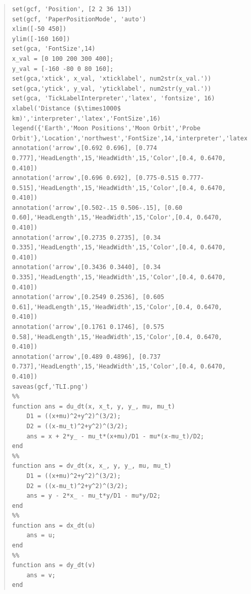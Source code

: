 \documentclass[conf]{new-aiaa}
\begin{document}
\begin{quote}
\begin{lstlisting}
set(gcf, 'Position', [2 2 36 13])
set(gcf, 'PaperPositionMode', 'auto')
xlim([-50 450])
ylim([-160 160])
set(gca, 'FontSize',14)
x_val = [0 100 200 300 400];
y_val = [-160 -80 0 80 160];
set(gca,'xtick', x_val, 'xticklabel', num2str(x_val.'))
set(gca,'ytick', y_val, 'yticklabel', num2str(y_val.'))
set(gca, 'TickLabelInterpreter','latex', 'fontsize', 16)
xlabel('Distance ($\times1000$ km)','interpreter','latex','FontSize',16)
legend({'Earth','Moon Positions','Moon Orbit','Probe Orbit'},'Location','northwest','FontSize',14,'interpreter','latex')
annotation('arrow',[0.692 0.696], [0.774 0.777],'HeadLength',15,'HeadWidth',15,'Color',[0.4, 0.6470, 0.410])
annotation('arrow',[0.696 0.692], [0.775-0.515 0.777-0.515],'HeadLength',15,'HeadWidth',15,'Color',[0.4, 0.6470, 0.410])
annotation('arrow',[0.502-.15 0.506-.15], [0.60 0.60],'HeadLength',15,'HeadWidth',15,'Color',[0.4, 0.6470, 0.410])
annotation('arrow',[0.2735 0.2735], [0.34 0.335],'HeadLength',15,'HeadWidth',15,'Color',[0.4, 0.6470, 0.410])
annotation('arrow',[0.3436 0.3440], [0.34 0.335],'HeadLength',15,'HeadWidth',15,'Color',[0.4, 0.6470, 0.410])
annotation('arrow',[0.2549 0.2536], [0.605 0.61],'HeadLength',15,'HeadWidth',15,'Color',[0.4, 0.6470, 0.410])
annotation('arrow',[0.1761 0.1746], [0.575 0.58],'HeadLength',15,'HeadWidth',15,'Color',[0.4, 0.6470, 0.410])
annotation('arrow',[0.489 0.4896], [0.737 0.737],'HeadLength',15,'HeadWidth',15,'Color',[0.4, 0.6470, 0.410])
saveas(gcf,'TLI.png')
%%
function ans = du_dt(x, x_t, y, y_, mu, mu_t)
    D1 = ((x+mu)^2+y^2)^(3/2);
    D2 = ((x-mu_t)^2+y^2)^(3/2);
    ans = x + 2*y_ - mu_t*(x+mu)/D1 - mu*(x-mu_t)/D2;
end
%%
function ans = dv_dt(x, x_, y, y_, mu, mu_t)
    D1 = ((x+mu)^2+y^2)^(3/2);
    D2 = ((x-mu_t)^2+y^2)^(3/2);
    ans = y - 2*x_ - mu_t*y/D1 - mu*y/D2;
end
%%
function ans = dx_dt(u)
    ans = u;
end
%%
function ans = dy_dt(v)
    ans = v;
end
    \end{lstlisting}
\end{quote}
\end{document}
